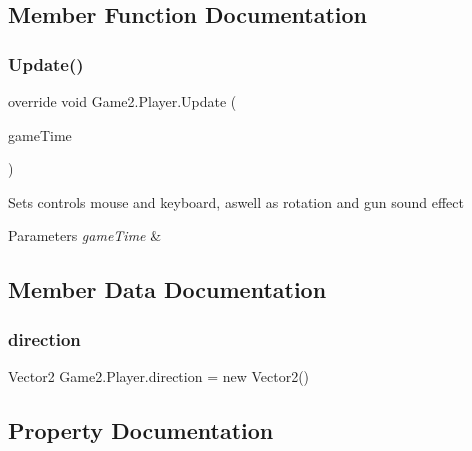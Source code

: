 \subsection{Member Function Documentation}
\mbox{\label{class_game2_1_1_player_a14ef301313a531bd8379300ef0588378}} 
\subsubsection{\texorpdfstring{Update()}{Update()}}
{\footnotesize\ttfamily override void Game2.\+Player.\+Update (\begin{DoxyParamCaption}\item[{Game\+Time}]{game\+Time }\end{DoxyParamCaption})}



Sets controls mouse and keyboard, aswell as rotation and gun sound effect 


\begin{DoxyParams}{Parameters}
{\em game\+Time} & \\
\hline
\end{DoxyParams}


\subsection{Member Data Documentation}
\mbox{\label{class_game2_1_1_player_ae8c457659c53b82a059739f18c52de9c}} 
\subsubsection{\texorpdfstring{direction}{direction}}
{\footnotesize\ttfamily Vector2 Game2.\+Player.\+direction = new Vector2()}



\subsection{Property Documentation}
\mbox{\label{class_game2_1_1_player_a0f289bb7a69b375f4c0bb7bf5ab87430}} 
